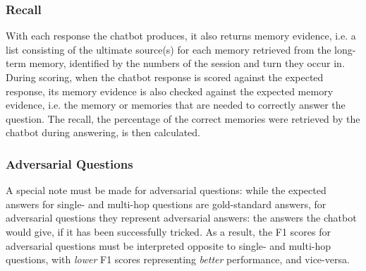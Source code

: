 \subsubsection{Recall}

With each response the chatbot produces, it also returns memory evidence, i.e. a list consisting of the ultimate source(s) for each memory retrieved from the long-term memory, identified by the numbers of the session and turn they occur in. During scoring, when the chatbot response is scored against the expected response, its memory evidence is also checked against the expected memory evidence, i.e. the memory or memories that are needed to correctly answer the question. The recall, the percentage of the correct memories were retrieved by the chatbot during answering, is then calculated.


\subsubsection{Adversarial Questions}

A special note must be made for adversarial questions: while the expected answers for single- and multi-hop questions are gold-standard answers, for adversarial questions they represent adversarial answers: the answers the chatbot would give, if it has been successfully tricked. As a result, the F1 scores for adversarial questions must be interpreted opposite to single- and multi-hop questions, with \textit{lower} F1 scores representing \textit{better} performance, and vice-versa.
















